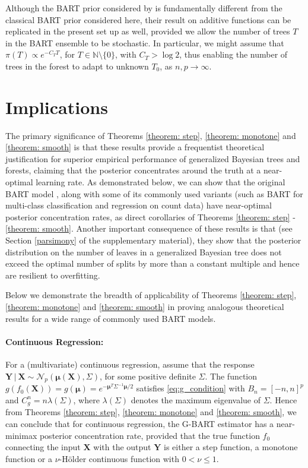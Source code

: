 \documentclass[12pt]{article}
\newcommand{\bm}[1]{\boldsymbol{#1}}
\newcommand{\Y}{\bm{Y}}
\newcommand{\1}{\mathbb{I}}
\def\C {\,|\:}
\def\C {\,|\:}
\def\Y{\bm{Y}}
\def\X{\bm{X}}
\def\C{\mbox{\boldmath$C$}}
\def\X{\mbox{\boldmath$X$}}
\renewcommand{\Y}{\bm{Y}}
\def\C {\,|\:}
\def\C {\,|\:}
\def\X{\bm{X}}
\theoremstyle{plain}
\theoremstyle{definition}
\theoremstyle{remark}
\begin{document}
Although the BART prior considered by \cite{rockova2020posterior} is fundamentally different from the classical BART prior \citep{chipman2010bart} considered here, their result on additive functions can be replicated in the present set up as well, provided we allow the number of trees $T$ in the BART ensemble to be stochastic. In particular, we might assume that $\pi(T) \propto e^{-C_T T}$, for $T \in \mathbb{N} \setminus \{0\}$, with $C_T > \log 2$,
thus enabling the number of trees in the forest to adapt to unknown $T_0$, as $n, p \rightarrow \infty$.

\section{Implications}\label{sec: implications}

The primary significance of Theorems \ref{theorem: step}, \ref{theorem: monotone} and \ref{theorem: smooth} is that these results provide a frequentist theoretical justification for superior empirical performance of generalized Bayesian trees and forests, claiming that the posterior concentrates around the truth at a near-optimal learning rate. As demonstrated below, we can show that the original BART model \citep{chipman2010bart}, along with some of its commonly used variants (such as BART for multi-class classification and regression on count data) have near-optimal posterior concentration rates, as direct corollaries of Theorems \ref{theorem: step} - \ref{theorem: smooth}. Another important consequence of these results is that (see Section \ref{parsimony} of the supplementary material), they show that the posterior distribution on the number of leaves in a generalized Bayesian tree does not exceed the optimal number of splits by more than a constant multiple and hence are resilient to overfitting.

Below we demonstrate the breadth of applicability of Theorems \ref{theorem: step}, \ref{theorem: monotone} and \ref{theorem: smooth} in proving analogous theoretical results for a wide range of commonly used BART models. 

\paragraph{Continuous Regression:} 
For a (multivariate) continuous regression, assume that the response $\Y \C \X \sim \mathcal{N}_p(\bm{\mu}(\X),\Sigma)$, for some positive definite $\Sigma$. The function $g(f_0(\X)) = g(\bm{\mu})=e^{-\bm{\mu}^T \Sigma^{-1}\bm{\mu}/2}$ satisfies \eqref{eq:g_condition} with $B_n=[-n,n]^p$ and $C_g^n= n \lambda(\Sigma) $, where $\lambda(\Sigma)$ denotes the maximum eigenvalue of $\Sigma$. Hence from Theorems \ref{theorem: step}, \ref{theorem: monotone} and \ref{theorem: smooth}, we can conclude that for continuous regression, the G-BART estimator has a near-minimax posterior concentration rate, provided that the true function $f_0$ connecting the input $\X$ with the output $\Y$ is either a step function, a monotone function or a $\nu$-H\"{o}lder continuous function with $0 < \nu \le 1$.
\end{document}
